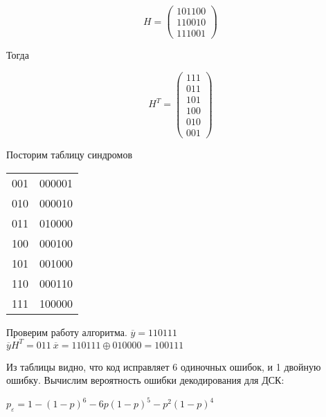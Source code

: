 \documentclass[../main.tex]{subfiles}
\begin{document}
\begin{equation*}
    H = \left( 
    \begin{array}{cccccc}
         101100  \\
         110010  \\
         111001
    \end{array}
    \right)
\end{equation*} 

Тогда 

\begin{equation*}
    H^T = \left( 
    \begin{array}{ccc}
         111 \\
         011 \\
         101 \\
         100 \\
         010 \\
         001
    \end{array}
    \right)
\end{equation*} 

Посторим таблицу синдромов

\begin{center}
    \begin{tabular}{|c|c|}
    \hline
     001 & 000001\\ 
     010 & 000010\\ 
     011 & 010000\\ 
     100 & 000100\\ 
     101 & 001000\\ 
     110 & 000110\\ 
     111 & 100000\\\hline
\end{tabular}
\end{center}

Проверим работу алгоритма. \newline $\overline{y}=110111$ \newline
$\overline{y}H^T=011\ \overline{x}=110111 \oplus 010000 = 100111 $

Из таблицы видно, что код исправляет 6 одиночных ошибок, и 1 двойную ошибку. Вычислим вероятность ошибки декодирования для ДСК:

$p_\varepsilon=1-(1-p)^6 - 6p(1-p)^5 - p^2(1-p)^4$
\end{document}

